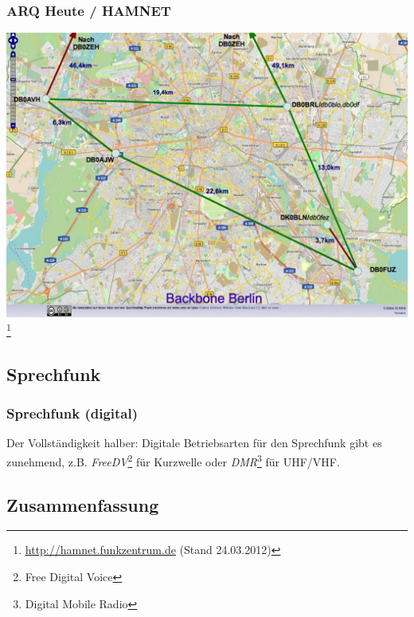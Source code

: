 \begin{frame}
    \frametitle{ARQ Heute / HAMNET}

    \begin{center}
        \includegraphics[width=.8\textwidth,height=.75\textheight,keepaspectratio]{e16/backbone_berlin1201.jpg}
        \footnote{\url{http://hamnet.funkzentrum.de} (Stand 24.03.2012)}
    \end{center}

\end{frame}

\subsection{Sprechfunk}

\begin{frame}
    \frametitle{Sprechfunk (digital)}


    Der Vollständigkeit halber: Digitale Betriebsarten für den Sprechfunk gibt
    es zunehmend, z.B. \emph{FreeDV}\footnote{Free Digital Voice} für Kurzwelle oder \emph{DMR}\footnote{Digital Mobile Radio} für UHF/VHF.

\end{frame}

\subsection{Zusammenfassung}

